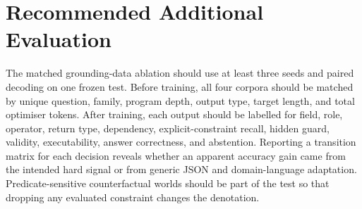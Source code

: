\section{Recommended Additional Evaluation}
\label{app:future-eval}

The matched grounding-data ablation should use at least three seeds and paired decoding on one
frozen test.  Before training, all four corpora should be matched by unique question, family,
program depth, output type, target length, and total optimiser tokens.  After training, each output
should be labelled for field, role, operator, return type, dependency, explicit-constraint recall,
hidden guard, validity, executability, answer correctness, and abstention.  Reporting a transition
matrix for each decision reveals whether an apparent accuracy gain came from the intended hard
signal or from generic JSON and domain-language adaptation.  Predicate-sensitive counterfactual
worlds should be part of the test so that dropping any evaluated constraint changes the denotation.
